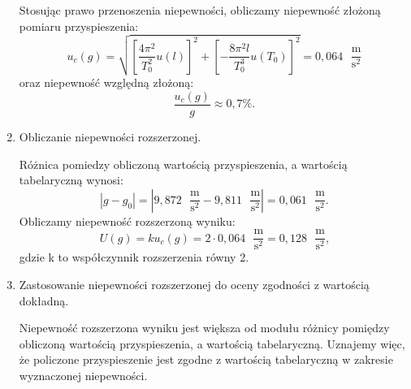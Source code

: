 \documentclass [a4paper,11pt]{article}
\begin{document}
\begin{enumerate}[label=\alph*)]
		Stosując prawo przenoszenia niepewności, obliczamy niepewność złożoną pomiaru przyspieszenia:
		\begin{equation}
		\label{eq:niepewnosc}
			u_c(g) = \sqrt{ \left[ \frac{4\pi^2}{T_0^2}u(l) \right]^2 + \left[ -\frac{8\pi^2l}{T_0^3}u(T_0) \right]^2} = 0,064 \text{ }\mathrm{\frac{m}{s^2}}
		\end{equation}
		oraz niepewność względną złożoną:
		\begin{equation}
		\label{eq:niepewnoscwzgl}
		\frac{u_c(g)}{g} \approx  0,7 \%\text{.}
		\end{equation}
		
		\item Obliczanie niepewności rozszerzonej.
		
		Różnica pomiedzy obliczoną wartością przyspieszenia, a wartością tabelaryczną wynosi:
		\begin{equation}
		\label{eq:roznica}
			|g - g_0| = \left|9,872 \text{ }\mathrm{\frac{m}{s^2}} - 9,811 \text{ }\mathrm{\frac{m}{s^2}}\right| = 0,061 \text{ }\mathrm{\frac{m}{s^2}}.
		\end{equation}
		Obliczamy niepewność rozszerzoną wyniku:
		\begin{equation}
		\label{eq:rozszerzona}
			U(g) = ku_c(g) = 2 \cdot 0,064 \text{ }\mathrm{\frac{m}{s^2}} = 0,128 \text{ }\mathrm{\frac{m}{s^2}}\text{,}
		\end{equation}
		gdzie k to współczynnik rozszerzenia równy 2.
		
		\item Zastosowanie niepewności rozszerzonej do oceny zgodności z wartością dokładną.
		
		Niepewność rozszerzona wyniku jest większa od modułu różnicy pomiędzy obliczoną wartością przyspieszenia, a wartością tabelaryczną. Uznajemy więc, że policzone przyspieszenie jest zgodne z wartością tabelaryczną w zakresie wyznaczonej niepewności.
	\end{enumerate}
\end{document}
